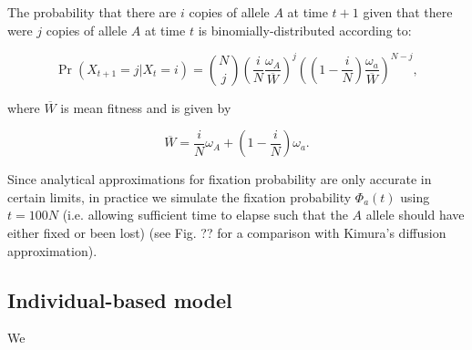 \documentclass{article}
\begin{document}
The probability that there are $i$ copies of allele $A$ at time $t+1$ given that there were $j$ copies of allele $A$ at time $t$ is binomially-distributed according to:

\[
  \Pr \left( X_{t+1} = j | X_t = i  \right) = \binom{N}{j} \left(\frac{ i}{N}\frac{\omega_A}{\overline{W}}\right)^j \left(\left(1 - \frac{i}{N}\right)\frac{\omega_a}{\overline{W}}\right)^{N-j},
\]

where $\overline{W}$ is mean fitness and is given by

\[
  \overline{W} = \frac{i}{N} \omega_A + \left( 1-\frac{i}{N} \right) \omega_a.
\]

Since analytical approximations for fixation probability are only accurate in certain limits, in practice we simulate the fixation probability $\Phi_a(t)$ using $t=100N$ (i.e. allowing sufficient time to elapse such that the $A$ allele should have either fixed or been lost) (see Fig. ?? for a comparison with Kimura's diffusion approximation).

\subsection{Individual-based model}
\label{sec:indiv-based-model}

We 
\end{document}
